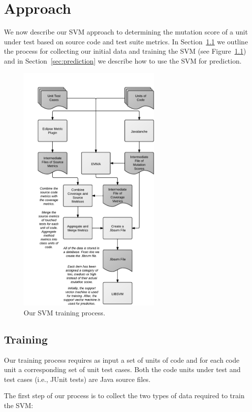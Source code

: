 \chapter{Approach}
\label{chap:approach}
We now describe our SVM approach to determining the mutation score of a unit under test based on source code and test suite metrics. In Section~\ref{sec:training} we outline the process for collecting our initial data and training the SVM (see Figure~\ref{fig:process}) and in Section~\ref{sec:prediction} we describe how to use the SVM for prediction.

\begin{figure}[!t]
  \centering
  \includegraphics[width=7cm]{figures/process.pdf}
  \caption{Our SVM training process.}
  \label{fig:process}
\end{figure}


\section{Training}
\label{sec:training}
Our training process requires as input a set of units of code and for each code unit a corresponding set of unit test cases. Both the code units under test and test cases (i.e., JUnit tests) are Java source files.

The first step of our process is to collect the two types of data required to train the SVM:

